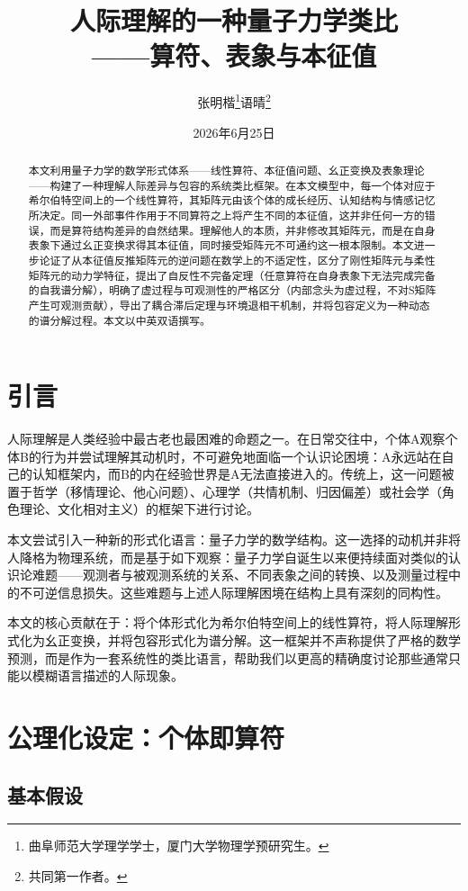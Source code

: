 ﻿\documentclass[12pt,a4paper]{ctexart}
\title{\textbf{人际理解的一种量子力学类比}\\——算符、表象与本征值}
\author{张明楷\thanks{曲阜师范大学理学学士，厦门大学物理学预研究生。}\quad 语晴\thanks{共同第一作者。}}
\date{2026年6月25日}
\begin{document}
\maketitle

\begin{abstract}
本文利用量子力学的数学形式体系——线性算符、本征值问题、幺正变换及表象理论——构建了一种理解人际差异与包容的系统类比框架。在本文模型中，每一个体对应于希尔伯特空间上的一个线性算符，其矩阵元由该个体的成长经历、认知结构与情感记忆所决定。同一外部事件作用于不同算符之上将产生不同的本征值，这并非任何一方的错误，而是算符结构差异的自然结果。理解他人的本质，并非修改其矩阵元，而是在自身表象下通过幺正变换求得其本征值，同时接受矩阵元不可通约这一根本限制。本文进一步论证了从本征值反推矩阵元的逆问题在数学上的不适定性，区分了刚性矩阵元与柔性矩阵元的动力学特征，提出了自反性不完备定理（任意算符在自身表象下无法完成完备的自我谱分解），明确了虚过程与可观测性的严格区分（内部念头为虚过程，不对S矩阵产生可观测贡献），导出了耦合滞后定理与环境退相干机制，并将包容定义为一种动态的谱分解过程。本文以中英双语撰写。
\end{abstract}

\section{引言}

人际理解是人类经验中最古老也最困难的命题之一。在日常交往中，个体A观察个体B的行为并尝试理解其动机时，不可避免地面临一个认识论困境：A永远站在自己的认知框架内，而B的内在经验世界是A无法直接进入的。传统上，这一问题被置于哲学（移情理论、他心问题）、心理学（共情机制、归因偏差）或社会学（角色理论、文化相对主义）的框架下进行讨论。

本文尝试引入一种新的形式化语言：量子力学的数学结构。这一选择的动机并非将人降格为物理系统，而是基于如下观察：量子力学自诞生以来便持续面对类似的认识论难题——观测者与被观测系统的关系、不同表象之间的转换、以及测量过程中的不可逆信息损失。这些难题与上述人际理解困境在结构上具有深刻的同构性。

本文的核心贡献在于：将个体形式化为希尔伯特空间上的线性算符，将人际理解形式化为幺正变换，并将包容形式化为谱分解。这一框架并不声称提供了严格的数学预测，而是作为一套系统性的类比语言，帮助我们以更高的精确度讨论那些通常只能以模糊语言描述的人际现象。

\section{公理化设定：个体即算符}

\subsection{基本假设}
\end{document}
